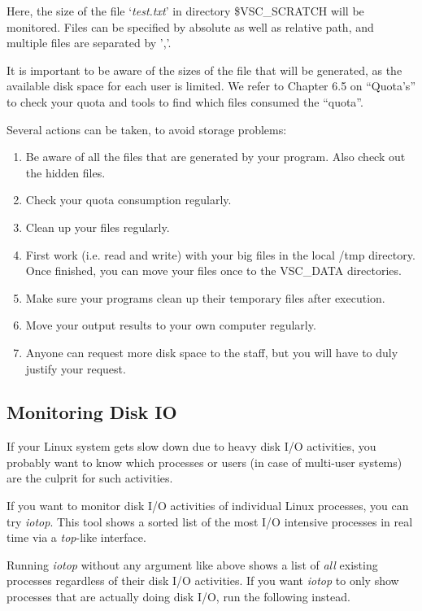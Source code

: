 Here, the size of the file `\emph{test.txt}' in directory \$VSC\_SCRATCH will
be monitored. Files can be specified by absolute as well as relative path, and
multiple files are separated by ','.

It is important to be aware of the sizes of the file that will be generated, as
the available disk space for each user is limited.  We refer to Chapter 6.5 on
``Quota's'' to check your quota and tools to find which files consumed the
``quota''.

Several actions can be taken, to avoid storage problems:

\begin{enumerate}
\item  Be aware of all the files that are generated by your program. Also check out the hidden files.
\item  Check your quota consumption regularly.
\item  Clean up your files regularly.
\item  First work (i.e. read and write) with your big files in the local /tmp directory. Once finished, you can move your files once to the VSC\_DATA directories.
\item  Make sure your programs clean up their temporary files after execution.
\item  Move your output results to your own computer regularly.
\item  Anyone can request more disk space to the \hpc staff, but you will have to duly justify your request.
\end{enumerate}

\subsection{Monitoring Disk IO}

If your Linux system gets slow down due to heavy disk I/O activities, you
probably want to know which processes or users (in case of multi-user systems)
are the culprit for such activities.

If you want to monitor disk I/O activities of individual Linux processes, you
can try \emph{iotop}. This tool shows a sorted list of the most I/O intensive
processes in real time via a \emph{top}-like interface.

\begin{prompt}
\end{prompt}

Running \emph{iotop} without any argument like above shows a list of \emph{all}
existing processes regardless of their disk I/O activities. If you want
\emph{iotop} to only show processes that are actually doing disk I/O, run the
following instead.

